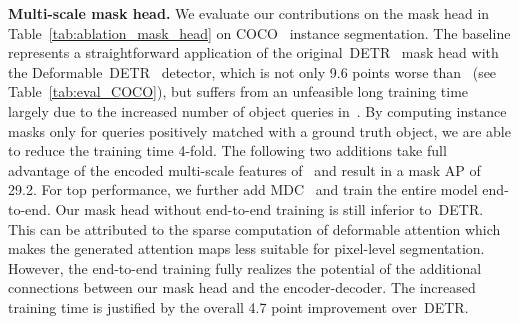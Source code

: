 \documentclass[runningheads]{llncs}
\newcommand{\detr}{\mbox{DETR}}
\begin{document}
\begin{table*}[t]
{ \label{tab:ablation_temporal}
 


}

\vspace{-0.3cm}

\end{table*}

 
\noindent \textbf{Multi-scale mask head.}
We evaluate our contributions on the mask head in Table~\ref{tab:ablation_mask_head} on COCO~\cite{COCO} instance segmentation.
The baseline represents a straightforward application of the original~\detr{}~\cite{DETR} mask head with the Deformable~\detr{}~\cite{deformable_detr} detector, which is not only 9.6 points worse than~\cite{DETR} (see Table~\ref{tab:eval_COCO}), but suffers from an unfeasible long training time largely due to the increased number of object queries in~\cite{deformable_detr}.
By computing instance masks only for queries positively matched with a ground truth object, we are able to reduce the training time 4-fold.
The following two additions take full advantage of the encoded multi-scale features of~\cite{deformable_detr} and result in a mask AP of 29.2.
For top performance, we further add MDC~\cite{zhu2018deformable} and train the entire model end-to-end.
Our mask head without end-to-end training is still inferior to~\detr{}.
This can be attributed to the sparse computation of deformable attention which makes the generated attention maps less suitable for pixel-level segmentation.
However, the end-to-end training fully realizes the potential of the additional connections between our mask head and the encoder-decoder.
The increased training time is justified by the overall 4.7 point improvement over~\detr{}.
\end{document}
